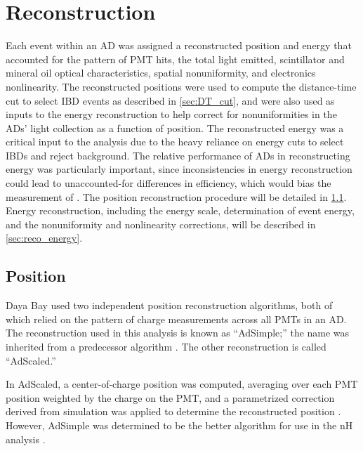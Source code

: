 \chapter{Reconstruction}
\label{ch:reconstruction}

Each event within an AD was assigned a reconstructed position and energy
that accounted for the pattern of PMT hits, the total light emitted,
scintillator and mineral oil optical characteristics,
spatial nonuniformity, and electronics nonlinearity.
The reconstructed positions were used to compute the distance-time cut
to select IBD events as described in \cref{sec:DT_cut},
and were also used as inputs to the energy reconstruction
to help correct for nonuniformities in the ADs' light collection
as a function of position.
The reconstructed energy was a critical input to the \thetaot{} analysis
due to the heavy reliance on energy cuts to select IBDs and reject background.
The relative performance of ADs in reconstructing energy
was particularly important, since inconsistencies in energy reconstruction
could lead to unaccounted-for differences in efficiency,
which would bias the measurement of \thetaot.
The position reconstruction procedure will be detailed in \cref{sec:reco_position}.
Energy reconstruction, including the energy scale, determination of event energy,
and the nonuniformity and nonlinearity corrections,
will be described in \cref{sec:reco_energy}.

\section{Position}
\label{sec:reco_position}

Daya Bay used two independent position reconstruction algorithms,
both of which relied on the pattern of charge measurements across all PMTs in an AD.
The reconstruction used in this \thetaot{} analysis is known as ``AdSimple;''
the name was inherited from a predecessor algorithm \cite{adsimple1}.
The other reconstruction is called ``AdScaled.''

In AdScaled, a center-of-charge position was computed,
averaging over each PMT position weighted by the charge on the PMT,
and a parametrized correction derived from simulation
was applied to determine the reconstructed position \cite{ngd2016}.
However, AdSimple was determined to be the better algorithm for use in the nH analysis
\cite{adsimple_vs_adscaled_nh}.

